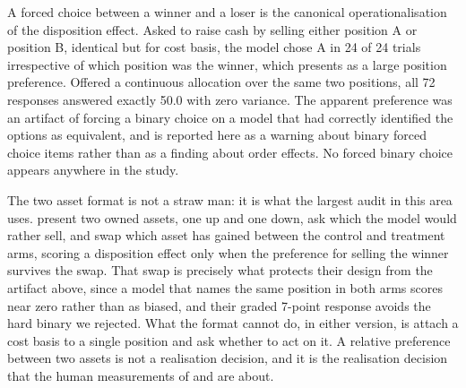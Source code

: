 \label{sec:rejected}\label{app:rejected}
A forced choice between a winner and a loser is the canonical
operationalisation of the disposition effect. Asked to raise cash by selling
either position A or position B, identical but for cost basis, the model
chose A in 24 of 24 trials irrespective of which position was the winner,
which presents as a large position preference. Offered a continuous
allocation over the same two positions, all 72 responses answered exactly
50.0 with zero variance. The apparent preference was an artifact of forcing a
binary choice on a model that had correctly identified the options as
equivalent, and is reported here as a warning about binary forced choice
items rather than as a finding about order effects. No forced binary choice
appears anywhere in the study.

The two asset format is not a straw man: it is what the largest audit in this
area uses. \citet{malberg2025comprehensive} present two owned assets, one up
and one down, ask which the model would rather sell, and swap which asset has
gained between the control and treatment arms, scoring a disposition effect
only when the preference for selling the winner survives the swap. That swap
is precisely what protects their design from the artifact above, since a
model that names the same position in both arms scores near zero rather than
as biased, and their graded 7-point response avoids the hard binary we
rejected. What the format cannot do, in either version, is attach a cost
basis to a single position and ask whether to act on it. A relative
preference between two assets is not a realisation decision, and it is the
realisation decision that the human measurements of
\citet{shefrin1985disposition} and \citet{odean1998losses} are about.
